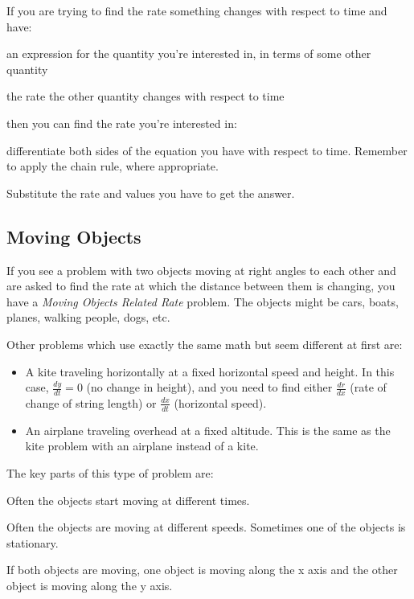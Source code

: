 \documentclass[fleqn]{exam}
\begin{document}
If you are trying to find the rate something changes with respect to time and have:
\begin{itemize*}
  \item an expression for the quantity you're interested in, in terms of some other quantity
  \item the rate the other quantity changes with respect to time
\end{itemize*}
then you can find the rate you're interested in:
\begin{itemize*}
  \item differentiate both sides of the equation you have with respect to time.  Remember to apply the chain rule, where
    appropriate.
  \item Substitute the rate and values you have to get the answer.
\end{itemize*}

\subsection{Moving Objects}

If you see a problem with two objects moving at right angles to each other and are asked to find the rate at which the
distance between them is changing, you have a {\em Moving Objects Related Rate} problem.  The objects might be cars,
boats, planes, walking people, dogs, etc.

Other problems which use exactly the same math but seem different at first are:
\begin{itemize}
\item A kite traveling horizontally at a fixed horizontal speed and height.  In this case, $\frac{dy}{dt} = 0$ (no
  change in height), and you need to find either $\frac{dr}{dx}$ (rate of change of string length) or $\frac{dx}{dt}$
  (horizontal speed).
\item An airplane traveling overhead at a fixed altitude.  This is the same as the kite problem with an airplane instead
  of a kite.
\end{itemize}

The key parts of this type of problem are:
\begin{itemize*}
\item Often the objects start moving at different times.
\item Often the objects are moving at different speeds.  Sometimes one of the objects is stationary.
\item If both objects are moving, one object is moving along the x axis and the other object is moving along the y axis.
\end{itemize*}
\end{document}
